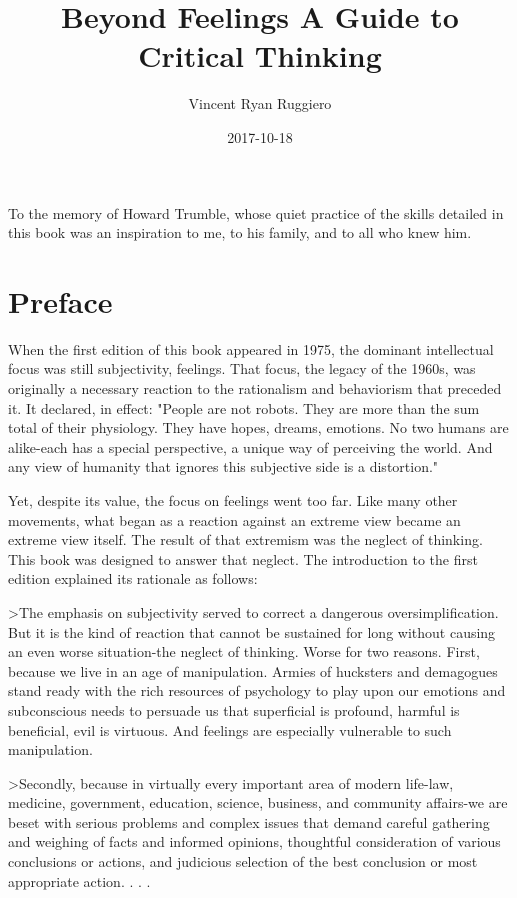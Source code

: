 \documentclass{book}
\title{Beyond Feelings A Guide to Critical Thinking}
\date{2017-10-18}
\author{Vincent Ryan Ruggiero}
\begin{document}
\maketitle
\newpage
\tableofcontents

To the memory of Howard Trumble, whose quiet practice of the skills detailed in this book was an inspiration to me, to his family, and to all who knew him.

\chapter{Preface}

When the first edition of this book appeared in 1975, the dominant intellectual focus was still subjectivity, feelings. That focus, the legacy of the 1960s, was originally a necessary reaction to the rationalism and behaviorism that preceded it. It declared, in effect: "People are not robots. They are more than the sum total of their physiology. They have hopes, dreams, emotions. No two humans are alike-each has a special perspective, a unique way of perceiving the world. And any view of humanity that ignores this subjective side is a distortion."

Yet, despite its value, the focus on feelings went too far. Like many other movements, what began as a reaction against an extreme view became an extreme view itself. The result of that extremism was the neglect of thinking. This book was designed to answer that neglect. The introduction to the first edition explained its rationale as follows:

>The emphasis on subjectivity served to correct a dangerous oversimplification. But it is the kind of reaction that cannot be sustained for long without causing an even worse situation-the neglect of thinking. Worse for two reasons. First, because we live in an age of manipulation. Armies of hucksters and demagogues stand ready with the rich resources of psychology to play upon our emotions and subconscious needs to persuade us that superficial is profound, harmful is beneficial, evil is virtuous. And feelings are especially vulnerable to such manipulation.

>Secondly, because in virtually every important area of modern life-law, medicine, government, education, science, business, and community affairs-we are beset with serious problems and complex issues that demand careful gathering and weighing of facts and informed opinions, thoughtful consideration of various conclusions or actions, and judicious selection of the best conclusion or most appropriate action. . . .
\end{document}
